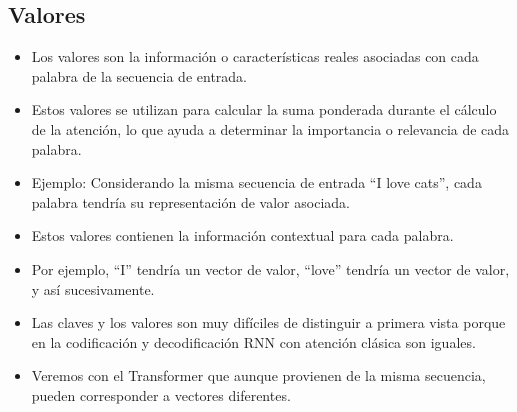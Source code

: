 \subsection{Valores}
\begin{itemize}
\item Los valores son la información o características reales asociadas con cada palabra de la secuencia de entrada.
\item Estos valores se utilizan para calcular la suma ponderada durante el cálculo de la atención, lo que ayuda a determinar la importancia o relevancia de cada palabra.
\item Ejemplo: Considerando la misma secuencia de entrada ``I love cats'', cada palabra tendría su representación de valor asociada.
\item Estos valores contienen la información contextual para cada palabra.
\item Por ejemplo, ``I'' tendría un vector de valor, ``love'' tendría un vector de valor, y así sucesivamente.
\item Las claves y los valores son muy difíciles de distinguir a primera vista porque en la codificación y decodificación RNN con atención clásica son iguales.
\item Veremos con el Transformer que aunque provienen de la misma secuencia, pueden corresponder a vectores diferentes.
\end{itemize}

